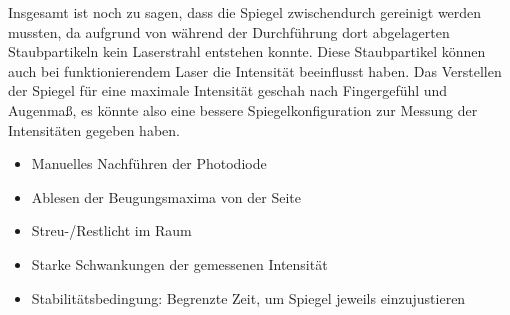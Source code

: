     Insgesamt ist noch zu sagen,
    dass die Spiegel zwischendurch gereinigt werden mussten,
    da aufgrund von während der Durchführung dort abgelagerten Staubpartikeln kein Laserstrahl entstehen konnte.
    Diese Staubpartikel können auch bei funktionierendem Laser die Intensität beeinflusst haben.
    Das Verstellen der Spiegel für eine maximale Intensität geschah nach Fingergefühl und Augenmaß,
    es könnte also eine bessere Spiegelkonfiguration zur Messung der Intensitäten gegeben haben.

\begin{itemize}
    \item Manuelles Nachführen der Photodiode
    \item Ablesen der Beugungsmaxima von der Seite
    \item Streu-/Restlicht im Raum
    \item Starke Schwankungen der gemessenen Intensität
    \item Stabilitätsbedingung: Begrenzte Zeit, um Spiegel jeweils einzujustieren
\end{itemize}
